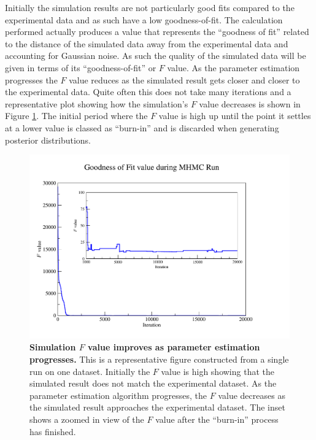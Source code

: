 Initially the simulation results are not particularly good fits compared to the experimental data and as such have a low goodness-of-fit. The calculation performed actually produces a value that represents the ``goodness of fit'' related to the distance of the simulated data away from the experimental data and accounting for Gaussian noise. As such the quality of the simulated data will be given in terms of its ``goodness-of-fit'' or $F$ value. As the parameter estimation progresses the $F$ value reduces as the simulated result gets closer and closer to the experimental data. Quite often this does not take many iterations and a representative plot showing how the simulation's $F$ value decreases is shown in Figure \ref{fig:oxy_fitness}. The initial period where the $F$ value is high up until the point it settles at a lower value is classed as ``burn-in'' and is discarded when generating posterior distributions.

\begin{figure}[p]
 \centering
 \includegraphics[width=14cm]{./05-oxygenreduction/data/o2_fitness.pdf}
 \caption[Simulation $F$ value improves as parameter estimation progresses]{{\bf Simulation $F$ value improves as parameter estimation progresses.} This is a representative figure constructed from a single run on one dataset. Initially the $F$ value is high showing that the simulated result does not match the experimental dataset. As the parameter estimation algorithm progresses, the $F$ value decreases as the simulated result approaches the experimental dataset. The inset shows a zoomed in view of the $F$ value after the ``burn-in'' process has finished.
 \label{fig:oxy_fitness}}
\end{figure}
\afterpage{\clearpage}


